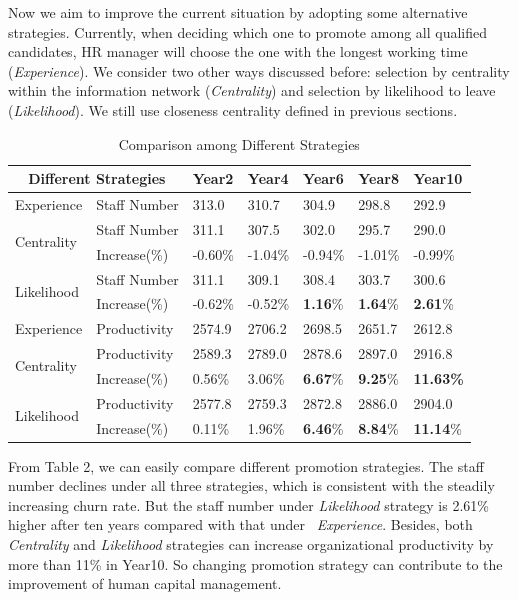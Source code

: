\documentclass[tcn = 37075, sheet = false, abstract = false]{mcmthesis}
\begin{document}
Now we aim to improve the current situation by adopting some alternative strategies. Currently, when deciding which one to promote among all qualified candidates, HR manager will choose the one with the longest working time (\textit{Experience}). We consider two other ways discussed before: selection by centrality within the information network (\textit{Centrality}) and selection by likelihood to leave (\textit{Likelihood}). We still use closeness centrality defined in previous sections. 

\begin{table}[htb!]
\centering
\begin{tabular}{lllllll}
\hline
\multicolumn{2}{c}{Different Strategies}     & Year2   & Year4   & Year6   & Year8   & Year10  \\ \hline
Experience                  & Staff Number & 313.0   & 310.7   & 304.9   & 298.8   & 292.9   \\
\multirow{2}{*}{Centrality} & Staff Number & 311.1   & 307.5   & 302.0   & 295.7   & 290.0   \\
                            & Increase(\%) & -0.60\% & -1.04\% & -0.94\% & -1.01\% & -0.99\% \\
\multirow{2}{*}{Likelihood} & Staff Number & 311.1   & 309.1   & 308.4   & 303.7   & 300.6   \\
                            & Increase(\%) & -0.62\% & -0.52\% & \textbf{1.16}\%  &\textbf{1.64}\%  & \textbf{2.61}\%  \\ \hline
Experience                  & Productivity & 2574.9  & 2706.2  & 2698.5  & 2651.7  & 2612.8  \\
\multirow{2}{*}{Centrality} & Productivity & 2589.3  & 2789.0  & 2878.6  & 2897.0  & 2916.8  \\
                            & Increase(\%) & 0.56\%  & 3.06\%  & \textbf{6.67}\%  & \textbf{9.25}\%  & \textbf{11.63\%} \\
\multirow{2}{*}{Likelihood} & Productivity & 2577.8  & 2759.3  & 2872.8  & 2886.0  & 2904.0  \\
                            & Increase(\%) & 0.11\%  & 1.96\%  & \textbf{6.46}\%  & \textbf{8.84}\%  & \textbf{11.14}\% \\ \hline
\end{tabular}
\label{tab:stra}
\caption{Comparison among Different Strategies}
\end{table}

From Table 2, we can easily compare different promotion strategies. The staff number declines under all three strategies, which is consistent with the steadily increasing churn rate. But the staff number under \textit{Likelihood} strategy is 2.61\% higher after ten years compared with that under \ 
\textit{Experience}. Besides, both \textit{Centrality} and \textit{Likelihood} strategies can increase organizational productivity by more than 11\% in Year10. So changing promotion strategy can contribute to the improvement of human capital management.
\end{document}
